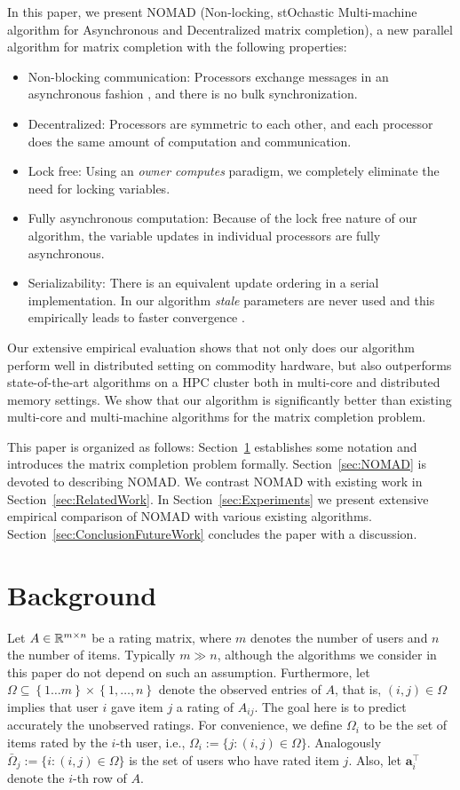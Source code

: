 \documentclass{vldb}
\newcommand{\ab}{\mathbf{a}}
\newcommand{\cbr}[1]{\left\{#1\right\}}
\newcommand{\Omegabar}{\bar{\Omega}}
\begin{document}
In this paper, we present NOMAD (Non-locking, stOchastic Multi-machine
algorithm for Asynchronous and Decentralized matrix completion), a new
parallel algorithm for matrix completion with the following properties: 
\begin{itemize}
\item Non-blocking communication: Processors exchange messages in an
  asynchronous fashion \citep{BerTsi97a}, and there is no bulk
  synchronization.
\item Decentralized: Processors are symmetric to each other, and each
  processor does the same amount of computation and communication.
\item Lock free: Using an \emph{owner computes} paradigm, we completely
  eliminate the need for locking variables. 
\item Fully asynchronous computation: Because of the lock free nature
  of our algorithm, the variable updates in individual processors are
  fully asynchronous.
\item Serializability: There is an equivalent update ordering in a
  serial implementation. In our algorithm \emph{stale} parameters are
  never used and this empirically leads to faster convergence
  \citep{LowGonKyrBicetal12}.
\end{itemize}
Our extensive empirical evaluation shows that not only does our
algorithm perform well in distributed setting on commodity hardware, but
also outperforms state-of-the-art algorithms on a HPC cluster both in
multi-core and distributed memory settings. We show that our algorithm
is significantly better than existing multi-core and multi-machine
algorithms for the matrix completion problem.

This paper is organized as follows: Section~\ref{sec:prior_work}
establishes some notation and introduces the matrix completion problem
formally. Section~\ref{sec:NOMAD} is devoted to describing NOMAD. We
contrast NOMAD with existing work in Section~\ref{sec:RelatedWork}.  In
Section~\ref{sec:Experiments} we present extensive empirical comparison
of NOMAD with various existing
algorithms. Section~\ref{sec:ConclusionFutureWork} concludes the paper
with a discussion.

\section{Background}
\label{sec:prior_work}

Let $A \in \mathbb{R}^{m \times n}$ be a rating matrix, where $m$ denotes the
number of users and $n$ the number of items. Typically $m \gg n$,
although the algorithms we consider in this paper do not depend on such
an assumption. Furthermore, let $\Omega \subseteq \cbr{1\ldots m} \times
\cbr{1,\ldots,n}$ denote the observed entries of $A$, that is, $(i,j)
\in \Omega$ implies that user $i$ gave item $j$ a rating of $A_{ij}$.
The goal here is to predict accurately the unobserved ratings.  For
convenience, we define $\Omega_{i}$ to be the set of items rated by the
$i$-th user, i.e., $ \Omega_{i} := \{ j : (i,j) \in \Omega \}$.
Analogously $\Omegabar_j := \{ i : (i,j) \in \Omega \}$ is the set of
users who have rated item $j$.  Also, let $\ab_{i}^{\top}$ denote the
$i$-th row of $A$.
\end{document}
